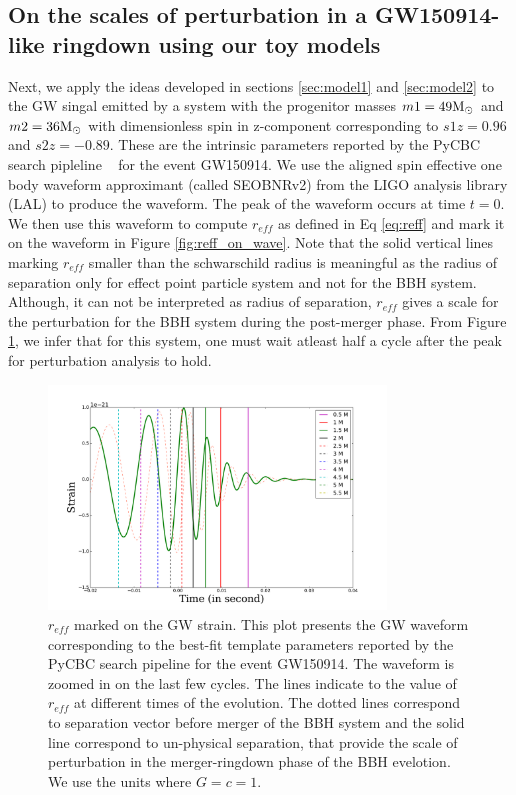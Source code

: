 \subsection{On the scales of perturbation in a GW150914-like ringdown using our toy models}
\label{sec:applicationToWaveform}
Next, we apply the ideas developed in sections \ref{sec:model1} and \ref{sec:model2} to the GW singal emitted by a system with the progenitor masses $m1=49 \mathrm{M}_\odot$ and $m2= 36 \mathrm{M}_\odot$ with dimensionless spin in z-component corresponding to $s1z=0.96$ and $s2z=-0.89$. These are the intrinsic parameters reported by the PyCBC search pipleline ~\cite{Canton:2014ena,Usman:2015kfa,Nitz:2017svb} for the event GW150914. We use the aligned spin effective one body waveform approximant (called SEOBNRv2) from the LIGO analysis library (LAL) to produce the waveform. The peak of the waveform occurs at time $t=0$. We then use this waveform to compute $r_{eff}$ as defined in Eq \ref{eq:reff} and mark it on the waveform in Figure \ref{fig:reff_on_wave}. Note that the solid vertical lines marking $r_{eff}$ smaller than the schwarschild radius is meaningful as the radius of separation only for effect point particle system and not for the BBH system. Although, it can not be interpreted as radius of separation, $r_{eff}$ gives a scale for the perturbation for the BBH system during the  post-merger phase. From Figure \ref{fiig:reff_on_wave}, we infer that for this system, one must wait atleast half a cycle after the peak for perturbation analysis to hold. 

\begin{figure}
\centering
\includegraphics[width=0.8\textwidth]{figures/reffmarking.pdf}
\caption{$r_{eff}$ marked on the GW strain. This plot presents the GW waveform corresponding to the best-fit template parameters reported by the PyCBC search pipeline for the event GW150914. The  waveform is zoomed in on the last few cycles. The lines indicate to the value of $r_{eff}$ at different times of the evolution. The dotted lines correspond to separation vector before merger of the BBH system and the solid line correspond to un-physical separation, that provide the scale of perturbation in the merger-ringdown phase of the BBH evelotion. We use the units where $G = c = 1$. }
\label{fiig:reff_on_wave}
\end{figure}

